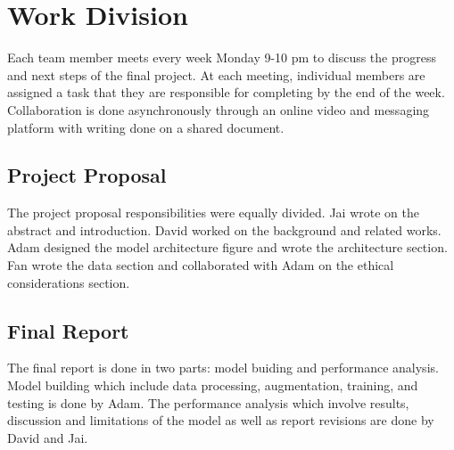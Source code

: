 \documentclass[../main.tex]{subfiles}
\begin{document}
\section{Work Division} 
Each team member meets every week Monday 9-10 pm to 
discuss the progress and next steps of the final project. At each meeting, 
individual members are assigned a task that they are responsible for completing 
by the end of the week. Collaboration is done asynchronously through an online 
video and messaging platform with writing done on a shared document.

\subsection{Project Proposal} 
The project proposal responsibilities were equally divided. Jai wrote on 
the abstract and introduction. David worked on the background and related works.
Adam designed the model architecture figure and wrote the architecture section. 
Fan wrote the data section and collaborated with Adam on the ethical 
considerations section.


\subsection{Final Report} 

The final report is done in two parts: model buiding and performance analysis. 
Model building which include data processing, augmentation, training, and testing
is done by Adam. 
The performance analysis which involve results, discussion and limitations of 
the model as well as report revisions are done by David and Jai.
\end{document}
